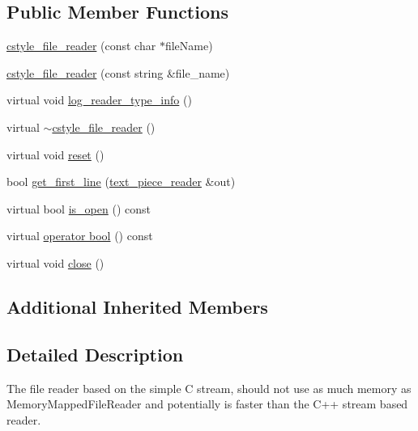 \subsection*{Public Member Functions}
\begin{DoxyCompactItemize}
\item 
\hyperlink{classuva_1_1utils_1_1file_1_1cstyle__file__reader_a418c508895ab31e88bcc6881f538d617}{cstyle\+\_\+file\+\_\+reader} (const char $\ast$file\+Name)
\item 
\hyperlink{classuva_1_1utils_1_1file_1_1cstyle__file__reader_af37127ff857a538f147bc51cc1869cf2}{cstyle\+\_\+file\+\_\+reader} (const string \&file\+\_\+name)
\item 
virtual void \hyperlink{classuva_1_1utils_1_1file_1_1cstyle__file__reader_ab69d33c1bfaedb2b4a09f7fb6688a65e}{log\+\_\+reader\+\_\+type\+\_\+info} ()
\item 
virtual \hyperlink{classuva_1_1utils_1_1file_1_1cstyle__file__reader_a609703364cf7e2aea1fb4664b985b281}{$\sim$cstyle\+\_\+file\+\_\+reader} ()
\item 
virtual void \hyperlink{classuva_1_1utils_1_1file_1_1cstyle__file__reader_aaec1cf506a91111fb65b313b04262184}{reset} ()
\item 
bool \hyperlink{classuva_1_1utils_1_1file_1_1cstyle__file__reader_a942c3a3517024132266cb864d773e68b}{get\+\_\+first\+\_\+line} (\hyperlink{classuva_1_1utils_1_1file_1_1text__piece__reader}{text\+\_\+piece\+\_\+reader} \&out)
\item 
virtual bool \hyperlink{classuva_1_1utils_1_1file_1_1cstyle__file__reader_a46c8f6b65f33b2af21413c648a428fbd}{is\+\_\+open} () const 
\item 
virtual \hyperlink{classuva_1_1utils_1_1file_1_1cstyle__file__reader_a85e5eea98b65e3c286df3c9f684e4c70}{operator bool} () const 
\item 
virtual void \hyperlink{classuva_1_1utils_1_1file_1_1cstyle__file__reader_acba48b65d8bcfe9a29aec4fe9b11152b}{close} ()
\end{DoxyCompactItemize}
\subsection*{Additional Inherited Members}


\subsection{Detailed Description}
The file reader based on the simple C stream, should not use as much memory as Memory\+Mapped\+File\+Reader and potentially is faster than the C++ stream based reader. 

